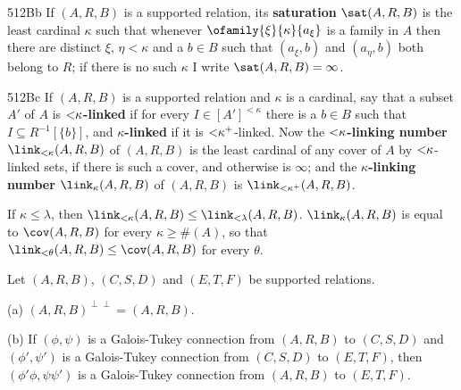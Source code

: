 
\spheader 512Bb If $(A,R,B)$ is a supported relation, its {\bf
saturation} $\sat(A,R,B)$ is the least cardinal $\kappa$ such that
whenever $\ofamily{\xi}{\kappa}{a_{\xi}}$ is a family in $A$ then there
are distinct $\xi$, $\eta<\kappa$ and a $b\in B$ such that $(a_{\xi},b)$
and $(a_{\eta},b)$ both belong to $R$;  if there is no such
$\kappa$ I write
$\sat(A,R,B)=\infty$.

\spheader 512Bc If $(A,R,B)$ is a supported relation and $\kappa$ is a
cardinal, say that a subset $A'$ of $A$ is
{\bf $\hbox{$<$}\kappa$-linked} if for
every $I\in[A']^{<\kappa}$ there is a $b\in B$ such that
$I\subseteq R^{-1}[\{b\}]$, and {\bf $\kappa$-linked} if it is
$\hbox{$<$}\kappa^+$-linked.   Now the
{\bf $\hbox{$<$}\kappa$-linking number} $\link_{<\kappa}(A,R,B)$ of
$(A,R,B)$ is the
least cardinal of any cover of $A$ by $\hbox{$<$}\kappa$-linked sets, if
there is such a cover, and otherwise is $\infty$;  and the
{\bf $\kappa$-linking number} $\link_{\kappa}(A,R,B)$ of $(A,R,B)$ is
$\link_{<\kappa^+}(A,R,B)$.

If $\kappa\le\lambda$, then $\link_{<\kappa}(A,R,B)\le\link_{<\lambda}(A,R,B)$.
 $\link_{\kappa}(A,R,B)$ is equal to
$\cov(A,R,B)$ for every $\kappa\ge\#(A)$, so that
$\link_{<\theta}(A,R,B)\le\cov(A,R,B)$ for every $\theta$.

 Let $(A,R,B)$, $(C,S,D)$ and $(E,T,F)$ be
supported relations.

(a) $(A,R,B)^{\perp\perp}=(A,R,B)$.

(b) If $(\phi,\psi)$ is a Galois-Tukey connection from $(A,R,B)$ to
$(C,S,D)$ and $(\phi',\psi')$ is a Galois-Tukey connection from
$(C,S,D)$ to $(E,T,F)$, then $(\phi'\phi,\psi\psi')$ is a Galois-Tukey
connection from $(A,R,B)$ to $(E,T,F)$.

